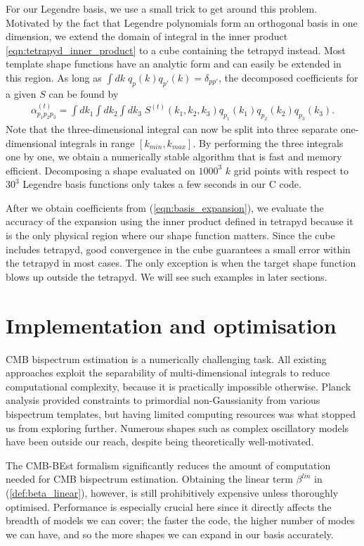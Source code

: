 For our Legendre basis, we use a small trick to get around this problem. Motivated by the fact that Legendre polynomials form an orthogonal basis in one dimension, we extend the domain of integral in the inner product \eqref{eqn:tetrapyd_inner_product} to a cube containing the tetrapyd instead. Most template shape functions have an analytic form and can easily be extended in this region. As long as $\int dk \; q_p(k) q_{p'}(k) = \delta_{pp'}$, the decomposed coefficients for a given $S$ can be found by
\begin{align}
	\alpha^{(t)}_{p_1 p_2 p_3} = \int dk_1 \int dk_2 \int dk_3 \; S^{(t)}(k_1, k_2, k_3) q_{p_1}(k_1) q_{p_2}(k_2) q_{p_3}(k_3). \label{eqn:basis_expansion}
\end{align}
Note that the three-dimensional integral can now be split into three separate one-dimensional integrals in range $[k_{min}, k_{max}]$. By performing the three integrals one by one, we obtain a numerically stable algorithm that is fast and memory efficient. Decomposing a shape evaluated on $1000^3$ $k$ grid points with respect to $30^3$ Legendre basis functions only takes a few seconds in our \textsc{C} code.

After we obtain coefficients from (\ref{eqn:basis_expansion}), we evaluate the accuracy of the expansion using the inner product defined in tetrapyd because it is the only physical region where our shape function matters. Since the cube includes tetrapyd, good convergence in the cube guarantees a small error within the tetrapyd in most cases. The only exception is when the target shape function blows up outside the tetrapyd. We will see such examples in later sections.


\section{Implementation and optimisation} \label{section:implementation}

CMB bispectrum estimation is a numerically challenging task. All existing approaches exploit the separability of multi-dimensional integrals to reduce computational complexity, because it is practically impossible otherwise. Planck analysis provided constraints to primordial non-Gaussianity from various bispectrum templates, but having limited computing resources was what stopped us from exploring further. Numerous shapes such as complex oscillatory models have been outside our reach, despite being theoretically well-motivated.

The CMB-BEst formalism significantly reduces the amount of computation needed for CMB bispectrum estimation. Obtaining the linear term $\beta^{lin}$ in (\ref{def:beta_linear}), however, is still prohibitively expensive unless thoroughly optimised. Performance is especially crucial here since it directly affects the breadth of models we can cover; the faster the code, the higher number of modes we can have, and so the more shapes we can expand in our basis accurately.

